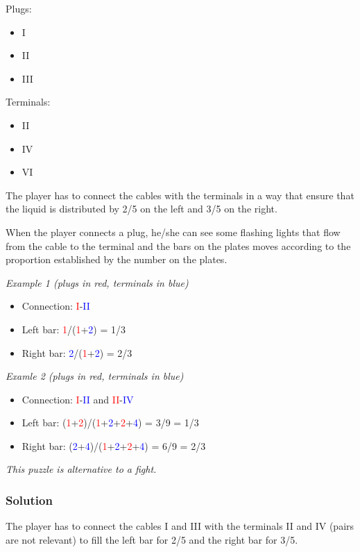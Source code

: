 Plugs:
\begin{itemize}
	\item I
	\item II
	\item III
\end{itemize}

Terminals:
\begin{itemize}
	\item II
	\item IV
	\item VI
\end{itemize}

The player has to connect the cables with the terminals in a way that ensure that the liquid is distributed by 2/5 on the left and 3/5 on the right.

When the player connects a plug, he/she can see some flashing lights that flow from the cable to the terminal and the bars on the plates moves according to the proportion established by the number on the plates.

\textit{Example 1 (plugs in red, terminals in blue)}
\begin{itemize}
	\item Connection: \textcolor{red}{I}-\textcolor{blue}{II}
	\item Left bar: \textcolor{red}{1}/(\textcolor{red}{1}+\textcolor{blue}{2}) = 1/3
	\item Right bar: \textcolor{blue}{2}/(\textcolor{red}{1}+\textcolor{blue}{2}) = 2/3
\end{itemize}

\textit{Examle 2 (plugs in red, terminals in blue)}
\begin{itemize}
	\item Connection: \textcolor{red}{I}-\textcolor{blue}{II} and \textcolor{red}{II}-\textcolor{blue}{IV}
	\item Left bar: (\textcolor{red}{1}+\textcolor{red}{2})/(\textcolor{red}{1}+\textcolor{blue}{2}+\textcolor{red}{2}+\textcolor{blue}{4}) = 3/9 = 1/3
	\item Right bar: (\textcolor{blue}{2}+\textcolor{blue}{4})/(\textcolor{red}{1}+\textcolor{blue}{2}+\textcolor{red}{2}+\textcolor{blue}{4}) = 6/9 = 2/3
\end{itemize}

\textit{This puzzle is alternative to a fight.}

\subsubsection*{Solution}
The player has to connect the cables I and III with the terminals II and IV (pairs are not relevant) to fill the left bar for 2/5 and the right bar for 3/5.

